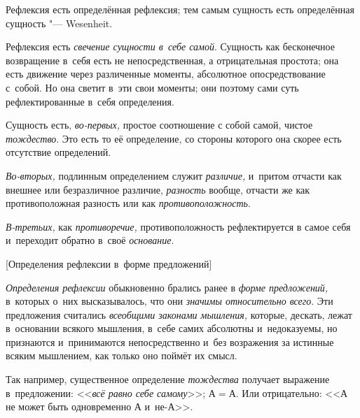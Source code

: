 
Рефлексия есть определённая рефлексия; тем самым
сущность есть определённая сущность "--- Wesenheit.

Рефлексия есть {\em свечение сущности в~себе самой}.
Сущность как бесконечное возвращение в~себя есть не непосредственная, а
отрицательная простота; она есть движение через различенные моменты,
абсолютное опосредствование с~собой. Но она светит в~эти свои моменты; они
поэтому сами суть рефлектированные в~себя определения.

Сущность есть, {\em во-первых,} простое соотношение с
собой самой, чистое {\em тождество}. Это есть то её
определение, со стороны которого она скорее есть отсутствие определений.

{\em Во-вторых,} подлинным определением служит {\em различие,} и~притом
отчасти как внешнее или безразличное различие, {\em разность} вообще,
отчасти же как противоположная разность или как {\em противоположность}.

{\em В-третьих,} как {\em противоречие,} противоположность рефлектируется в
самое себя и~переходит обратно в~своё {\em основание}.

%
  {[Определения рефлексии в~форме предложений]}

{\em Определения рефлексии} обыкновенно брались ранее в
{\em форме предложений,} в~которых о~них высказывалось,
что они {\em значимы относительно всего}. Эти
предложения считались {\em всеобщими законами
мышления,} которые, дескать, лежат в~основании всякого мышления, в~себе
самих абсолютны и~недоказуемы, но признаются и~принимаются непосредственно
и~без возражения за истинные всяким мышлением, как только оно поймёт их смысл.

Так например, существенное определение {\em тождества}
получает выражение в~предложении: <<{\em всё равно себе
самому}>>; $А=А$. Или отрицательно: <<$А$ не может
быть одновременно $А$ и~не-$А$>>.

